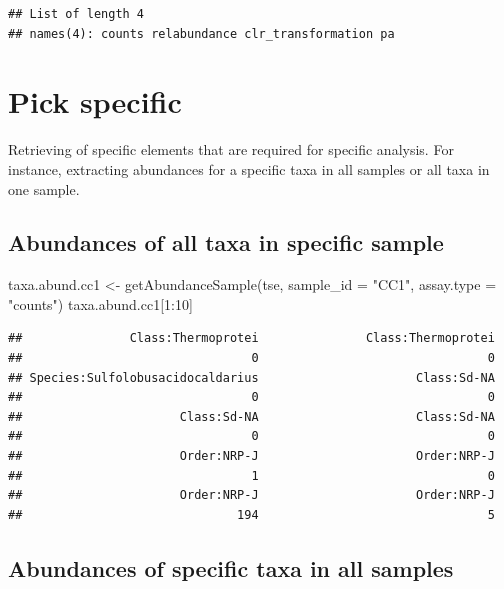 \documentclass[
]{book}
\newenvironment{Shaded}{\begin{snugshade}}{\end{snugshade}}
\newcommand{\AttributeTok}[1]{\textcolor[rgb]{0.77,0.63,0.00}{#1}}
\newcommand{\DecValTok}[1]{\textcolor[rgb]{0.00,0.00,0.81}{#1}}
\newcommand{\FunctionTok}[1]{\textcolor[rgb]{0.00,0.00,0.00}{#1}}
\newcommand{\NormalTok}[1]{#1}
\newcommand{\OtherTok}[1]{\textcolor[rgb]{0.56,0.35,0.01}{#1}}
\newcommand{\SpecialCharTok}[1]{\textcolor[rgb]{0.00,0.00,0.00}{#1}}
\newcommand{\StringTok}[1]{\textcolor[rgb]{0.31,0.60,0.02}{#1}}
\begin{document}
\begin{verbatim}
## List of length 4
## names(4): counts relabundance clr_transformation pa
\end{verbatim}

\hypertarget{pick-specific}{%
\section{Pick specific}\label{pick-specific}}

Retrieving of specific elements that are required for specific analysis. For
instance, extracting abundances for a specific taxa in all samples or all taxa
in one sample.

\hypertarget{abundances-of-all-taxa-in-specific-sample}{%
\subsection{Abundances of all taxa in specific sample}\label{abundances-of-all-taxa-in-specific-sample}}

\begin{Shaded}
\begin{Highlighting}[]
\NormalTok{taxa.abund.cc1 }\OtherTok{\textless{}{-}} \FunctionTok{getAbundanceSample}\NormalTok{(tse, }
                                     \AttributeTok{sample\_id =} \StringTok{"CC1"}\NormalTok{,}
                                     \AttributeTok{assay.type =} \StringTok{"counts"}\NormalTok{)}
\NormalTok{taxa.abund.cc1[}\DecValTok{1}\SpecialCharTok{:}\DecValTok{10}\NormalTok{]}
\end{Highlighting}
\end{Shaded}

\begin{verbatim}
##               Class:Thermoprotei               Class:Thermoprotei 
##                                0                                0 
## Species:Sulfolobusacidocaldarius                      Class:Sd-NA 
##                                0                                0 
##                      Class:Sd-NA                      Class:Sd-NA 
##                                0                                0 
##                      Order:NRP-J                      Order:NRP-J 
##                                1                                0 
##                      Order:NRP-J                      Order:NRP-J 
##                              194                                5
\end{verbatim}

\hypertarget{abundances-of-specific-taxa-in-all-samples}{%
\subsection{Abundances of specific taxa in all samples}\label{abundances-of-specific-taxa-in-all-samples}}
\end{document}
